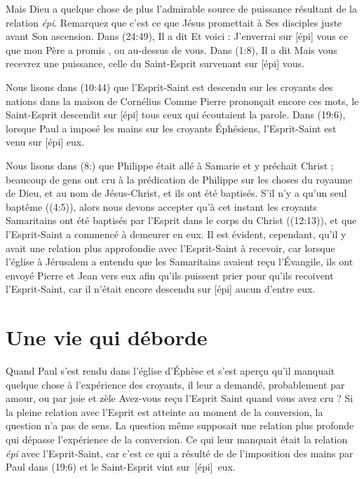 Mais Dieu a quelque chose de plus \ocadr l'admirable source de puissance
 résultant de la relation \emph{épi}.
 Remarquez que c'est ce que Jésus promettait à Ses disciples juste avant
 Son ascension. Dans (24:49), Il a dit\frcolon{}
 \Og Et voici : J'enverrai sur [épi] vous ce que mon Père a promis \Fg{},
 ou \Og au-dessus de vous. \Fg{}
 Dans (1:8), Il a dit\frcolon{}
 \Og Mais vous recevrez une puissance, celle du Saint-Esprit survenant
 sur [épi] vous. \Fg{}

Nous lisons dans (10:44) que l'Esprit-Saint est descendu
 \Og sur \Fg{} les croyants des nations dans la maison de Cornélius\frcolon{}
 \Og Com\-me Pierre prononçait encore ces mots, le Saint-Esprit descendit
 sur [épi] tous ceux qui écoutaient la parole. \Fg{}
 Dans (19:6), lorsque Paul a imposé les mains sur les
 croyants Éphésiens, l'Esprit-Saint est venu sur [épi] eux.

Nous lisons dans (8:) que Philippe était allé à Samarie
 et y préchait Christ ; beaucoup de gens ont cru à la prédication de Philippe
 sur les choses du royaume de Dieu, et au nom de Jésus-Christ,
 et ils ont été baptisés.
 S'il n'y a qu'un seul baptême ((4:5)),
 alors nous devons accepter qu'à cet instant les croyants Samaritains
 ont été baptisés par l'Esprit dans le corps du Christ
 ((12:13)), et que l'Esprit-Saint a commencé à demeurer
 en eux. Il est évident, cependant, qu'il y avait une relation plus approfondie
 avec l'Esprit-Saint à recevoir, car lorsque l'église à Jérusalem a entendu
 que les Samaritains avaient reçu l'Évangile, ils ont envoyé Pierre et Jean
 vers eux afin qu'ils puissent prier pour qu'ils recoivent l'Esprit-Saint,
 car il n'était encore descendu sur [épi] aucun d'entre eux.

\section{Une vie qui d\'eborde}

Quand Paul s'est rendu dans l'église d'Éphèse et s'est aperçu
 qu'il manquait quelque chose à l'expérience des croyants, 
 il leur a demandé,
 probablement par amour, ou par joie et zèle\frcolon{}
 \Og Avez-vous reçu l'Esprit Saint quand vous avez cru ? \Fg{}
 Si la pleine relation avec l'Esprit est atteinte au moment de
 la conversion, la question n'a pas de sens.
 La question même supposait une relation plus profonde qui dépasse
 l'expérience  de la conversion.
 Ce qui leur manquait était la relation
 \emph{épi} avec l'Es\-prit-Saint, car c'est ce qui a résulté de
 de l'imposition des mains par Paul dans (19:6)\frcolon{}
 \Og et le Saint-Esprit vint sur~[épi]~eux. \Fg{}

